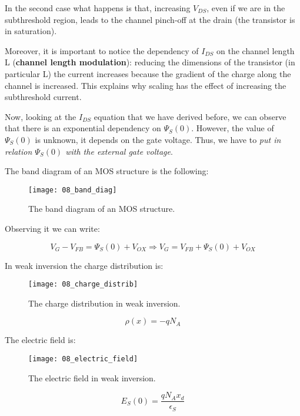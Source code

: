 \documentclass[a4paper, 12pt, twoside, openright]{report}
\begin{document}
In the second case what happens is that, increasing $V_{DS}$, even if we are in the subthreshold region, leads to the channel pinch-off at the drain (the transistor is in saturation).

Moreover, it is important to notice the dependency of $I_{DS}$ on the channel length L (\textbf{channel length modulation}): reducing the dimensions of the transistor (in particular L) the current increases because the gradient of the charge along the channel is increased. This explains why scaling has the effect of increasing the subthreshold current.

Now, looking at the $I_{DS}$ equation that we have derived before, we can observe that there is an exponential dependency on $\Psi_S(0)$. However, the value of $\Psi_S(0)$ is unknown, it depends on the gate voltage. Thus, we have to \emph{put in relation $\Psi_S(0)$ with the external gate voltage}.

The band diagram of an MOS structure is the following:

	\begin{figure}[H]
	\centering
	\texttt{[image: 08\_band\_diag]}
	\caption{The band diagram of an MOS structure.}
	\label{}
	\end{figure}

Observing it we can write:

\begin{equation}
V_G - V_{FB} = \Psi_S(0) + V_{OX} \Rightarrow V_G = V_{FB} + \Psi_S(0) + V_{OX}
\label{Vg}
\end{equation}

In weak inversion the charge distribution is:

	\begin{figure}[H]
	\centering
	\texttt{[image: 08\_charge\_distrib]}
	\caption{The charge distribution in weak inversion.}
	\label{}
	\end{figure}

\begin{equation}
\rho(x) = -qN_A
\label{}
\end{equation}

The electric field is:

	\begin{figure}[H]
	\centering
	\texttt{[image: 08\_electric\_field]}
	\caption{The electric field in weak inversion.}
	\label{}
	\end{figure}

\begin{equation}
E_S(0) = \frac{qN_Ax_d}{\epsilon_S}
\label{electric_field}
\end{equation}
\end{document}
